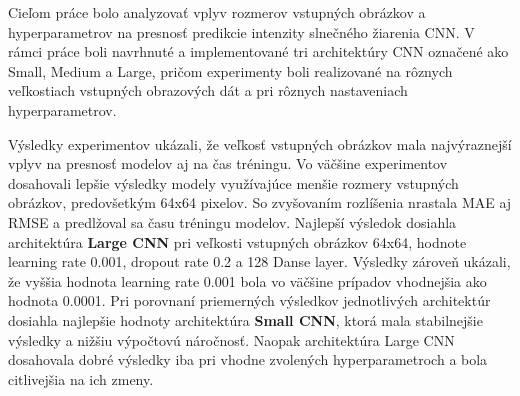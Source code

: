 Cieľom práce bolo analyzovať vplyv rozmerov vstupných obrázkov a hyperparametrov na presnosť predikcie intenzity slnečného žiarenia CNN. V rámci práce boli navrhnuté a implementované tri architektúry CNN označené ako Small, Medium a Large, pričom experimenty boli realizované na rôznych veľkostiach vstupných obrazových dát a pri rôznych nastaveniach hyperparametrov.

Výsledky experimentov ukázali, že veľkosť vstupných obrázkov mala najvýraznejší vplyv na presnosť modelov aj na čas tréningu. Vo väčšine experimentov dosahovali lepšie výsledky modely využívajúce menšie rozmery vstupných obrázkov, predovšetkým 64x64 pixelov.  So zvyšovaním rozlíšenia nrastala MAE aj RMSE a predlžoval sa času tréningu modelov.
Najlepší výsledok dosiahla architektúra \textbf{Large CNN} pri veľkosti vstupných obrázkov 64x64, hodnote learning rate 0.001, dropout rate 0.2 a 128 Danse layer. 
Výsledky zároveň ukázali, že vyššia hodnota learning rate 0.001 bola vo väčšine prípadov vhodnejšia ako hodnota 0.0001.
Pri porovnaní priemerných výsledkov jednotlivých architektúr dosiahla najlepšie hodnoty architektúra \textbf{Small CNN}, ktorá mala stabilnejšie výsledky a nižšiu výpočtovú náročnosť. 
Naopak architektúra Large CNN dosahovala dobré výsledky iba pri vhodne zvolených hyperparametroch a bola citlivejšia na ich zmeny.